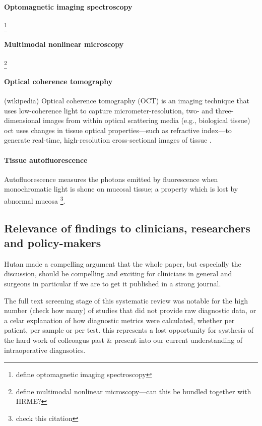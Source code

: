 \paragraph{Optomagnetic imaging spectroscopy} \cite{lisulb.PredictiveValueOptomagnetic2019}\footnote{define optomagnetic imaging spectroscopy} 
\paragraph{Multimodal nonlinear microscopy} \cite{heukes.MultimodalNonlinearMicroscopy2016}\footnote{define multimodal nonlinear microscopy---can this be bundled together with HRME?} 
\paragraph{Optical coherence tomography} (wikipedia) Optical coherence tomography (OCT) is an imaging technique that uses low-coherence light to capture micrometer-resolution, two- and three-dimensional images from within optical scattering media (e.g., biological tissue) \cite{hamdoonz.OpticalCoherenceTomography2016} \Gls{oct} uses changes in tissue optical properties---such as refractive index---to generate real-time, high-resolution cross-sectional images of tissue \cite{heidaria.e.UseOpticalCoherence2020}.
\paragraph{Tissue autofluorescence} \cite{ohnishiy.UsefulnessFluorescenceVisualization2016} Autofluorescence measures the photons emitted by fluorescence when monochromatic light is shone on mucosal tissue; a property which is lost by abnormal mucosa \cite{leey.-j.IntraoperativeFluorescenceGuidedSurgery2020}\footnote{check this citation}.

\subsection{Relevance of findings to clinicians, researchers and policy-makers}

Hutan made a compelling argument that the whole paper, but especially the discussion, should be compelling and exciting for clinicians in general and surgeons in particular if we are to get it published in a strong journal.

The full text screening stage of this systematic review was notable for the high number (check how many) of studies that did not provide raw diagnostic data, or a celar explanation of how diagnostic metrics were calculated, whether per patient, per sample or per test.
this represents a lost opportunity for systhesis of the hard work of colleoagus past \& present into our current understanding of intraoperative diagnsotics.


